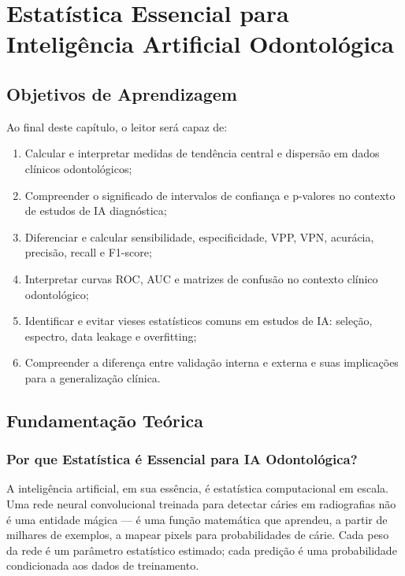 
\chapter{Estatística Essencial para Inteligência Artificial Odontológica}
\label{cap:estatistica-essencial}

\nivelbasico

\section{Objetivos de Aprendizagem}

Ao final deste capítulo, o leitor será capaz de:
\begin{enumerate}
    \item Calcular e interpretar medidas de tendência central e dispersão em dados clínicos odontológicos;
    \item Compreender o significado de intervalos de confiança e p-valores no contexto de estudos de IA diagnóstica;
    \item Diferenciar e calcular sensibilidade, especificidade, VPP, VPN, acurácia, precisão, recall e F1-score;
    \item Interpretar curvas ROC, AUC e matrizes de confusão no contexto clínico odontológico;
    \item Identificar e evitar vieses estatísticos comuns em estudos de IA: seleção, espectro, data leakage e overfitting;
    \item Compreender a diferença entre validação interna e externa e suas implicações para a generalização clínica.
\end{enumerate}

\section{Fundamentação Teórica}

\subsection{Por que Estatística é Essencial para IA Odontológica?}

A inteligência artificial, em sua essência, é estatística computacional em escala. Uma rede neural convolucional treinada para detectar cáries em radiografias não é uma entidade mágica — é uma função matemática que aprendeu, a partir de milhares de exemplos, a mapear pixels para probabilidades de cárie. Cada peso da rede é um parâmetro estatístico estimado; cada predição é uma probabilidade condicionada aos dados de treinamento.


